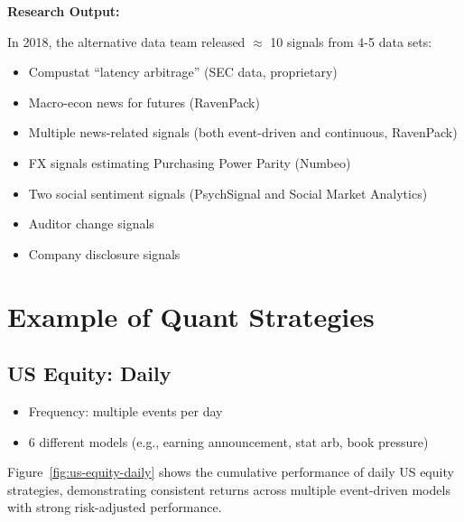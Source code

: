 \documentclass[11pt, letterpaper]{article}
\begin{document}
  \textbf{Research Output:}

  In 2018, the alternative data team released $\approx$ 10 signals from
  4-5 data sets:

  \begin{itemize}
    \item Compustat ``latency arbitrage'' (SEC data, proprietary)

    \item Macro-econ news for futures (RavenPack)

    \item Multiple news-related signals (both event-driven and
      continuous, RavenPack)

    \item FX signals estimating Purchasing Power Parity (Numbeo)

    \item Two social sentiment signals (PsychSignal and Social Market
      Analytics)

    \item Auditor change signals

    \item Company disclosure signals
  \end{itemize}

  \newpage
  \section{Example of Quant Strategies}
  \label{example-of-quant-strategies}

  \subsection{US Equity: Daily}
  \label{us-equity-daily}

  \begin{itemize}
    \item Frequency: multiple events per day

    \item 6 different models (e.g., earning announcement, stat arb, book
      pressure)
  \end{itemize}

  Figure~\ref{fig:us-equity-daily} shows the cumulative performance of daily
  US equity strategies, demonstrating consistent returns across multiple
  event-driven models with strong risk-adjusted performance.
\end{document}
